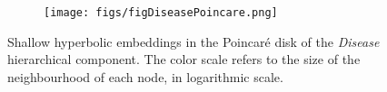 \begin{figure}
    \centering
    \begin{subfigure}[b]{0.6\textwidth}
        \centering
        \texttt{[image: figs/figDiseasePoincare.png]}
    \end{subfigure}
    \begin{subfigure}[b]{0.1\textwidth}
    \end{subfigure}
    \label{fig:diseasePoincare}
    \caption{Shallow hyperbolic embeddings in the Poincaré disk of the \emph{Disease} hierarchical component. The color scale refers to the size of the neighbourhood of each node, in logarithmic scale.}

\end{figure}